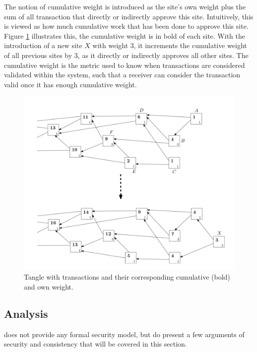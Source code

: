 The notion of cumulative weight is introduced as the site's own weight plus the sum of all transaction that directly or indirectly approve this site. Intuitively, this is viewed as how much cumulative work that has been done to approve this site. Figure \ref{fig:iota-transaction} illustrates this, the cumulative weight is in bold of each site. With the introduction of a new site $X$ with weight $3$, it increments the cumulative weight of all previous sites by $3$, as it directly or indirectly approves all other sites. The cumulative weight is the metric used to know when transactions are considered validated within the system, such that a receiver can consider the transaction valid once it has enough cumulative weight.

\begin{figure}[H]
    \centering
    \includegraphics[width=\linewidth]{images/iota-cumulative-weight.png}
    \caption{Tangle with transactions and their corresponding cumulative (bold) and own weight.}
    \label{fig:iota-transaction}
\end{figure}


\subsection{Analysis}

\cite{tangle} does not provide any formal security model, but do present a few arguments of security and consistency that will be covered in this section.


